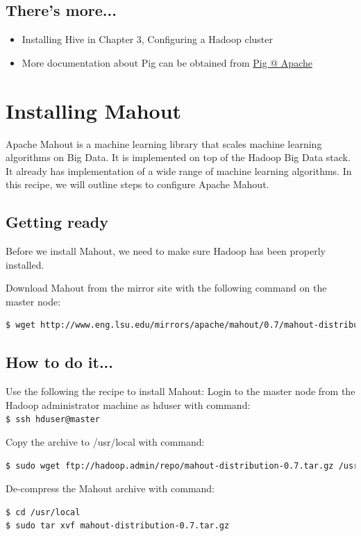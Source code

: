 \subsection*{There's more...}
\begin{itemize}
  \item Installing Hive in Chapter 3, Configuring a Hadoop cluster
  \item More documentation about Pig can be obtained from \href{http://pig.apache.org/docs/r0.10.0/}{Pig @ Apache}
\end{itemize}

\section{Installing Mahout}
Apache Mahout is a machine learning library that scales machine learning algorithms on Big Data. It is implemented on top of the Hadoop Big Data stack. It already has implementation of a wide range of machine learning algorithms. In this recipe, we will outline steps to configure Apache Mahout.
\subsection*{Getting ready}
Before we install Mahout, we need to make sure Hadoop has been properly installed.

Download Mahout from the mirror site with the following command on the master node:
\lstset{style=bashstyle}
\begin{lstlisting}[language=bash]
$ wget http://www.eng.lsu.edu/mirrors/apache/mahout/0.7/mahout-distribution-0.7.tar.gz -P ~/repo
\end{lstlisting}

\subsection*{How to do it...}
Use the following the recipe to install Mahout:
Login to the master node from the Hadoop administrator machine as hduser with command: \\
\verb|$ ssh hduser@master|

Copy the archive to /usr/local with command:
\lstset{style=bashstyle}
\begin{lstlisting}[language=bash]
$ sudo wget ftp://hadoop.admin/repo/mahout-distribution-0.7.tar.gz /usr/local
\end{lstlisting}

De-compress the Mahout archive with command: 
\lstset{style=bashstyle}
\begin{lstlisting}[language=bash]
$ cd /usr/local
$ sudo tar xvf mahout-distribution-0.7.tar.gz
\end{lstlisting}

